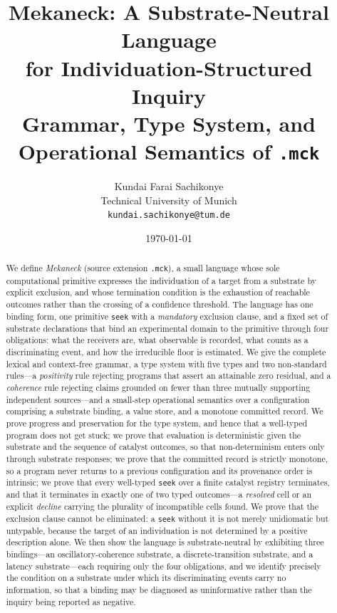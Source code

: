 \documentclass[11pt,a4paper]{article}
\title{\textbf{Mekaneck: A Substrate-Neutral Language\\[2pt]
for Individuation-Structured Inquiry}\\[4pt]
\large Grammar, Type System, and Operational Semantics of \texttt{.mck}}
\author{%
Kundai Farai Sachikonye\\
\small Technical University of Munich\\
\small \texttt{kundai.sachikonye@tum.de}}
\date{\today}
\theoremstyle{thmstyle}
\theoremstyle{definition}
\theoremstyle{remark}
\begin{document}
\maketitle

\begin{abstract}
\noindent
We define \emph{Mekaneck} (source extension \texttt{.mck}), a small language
whose sole computational primitive expresses the individuation of a target
from a substrate by explicit exclusion, and whose termination condition is
the exhaustion of reachable outcomes rather than the crossing of a
confidence threshold. The language has one binding form, one primitive
\texttt{seek} with a \emph{mandatory} exclusion clause, and a fixed set of
substrate declarations that bind an experimental domain to the primitive
through four obligations: what the receivers are, what observable is
recorded, what counts as a discriminating event, and how the irreducible
floor is estimated. We give the complete lexical and context-free grammar,
a type system with five types and two non-standard rules---a
\emph{positivity} rule rejecting programs that assert an attainable zero
residual, and a \emph{coherence} rule rejecting claims grounded on fewer
than three mutually supporting independent sources---and a small-step
operational semantics over a configuration comprising a substrate binding, a
value store, and a monotone committed record. We prove progress and
preservation for the type system, and hence that a well-typed program does
not get stuck; we prove that evaluation is deterministic given the substrate
and the sequence of catalyst outcomes, so that non-determinism enters only
through substrate responses; we prove that the committed record is strictly
monotone, so a program never returns to a previous configuration and its
provenance order is intrinsic; we prove that every well-typed \texttt{seek}
over a finite catalyst registry terminates, and that it terminates in
exactly one of two typed outcomes---a \emph{resolved} cell or an explicit
\emph{decline} carrying the plurality of incompatible cells found. We prove
that the exclusion clause cannot be eliminated: a \texttt{seek} without it
is not merely unidiomatic but untypable, because the target of an
individuation is not determined by a positive description alone. We then
show the language is substrate-neutral by exhibiting three bindings---an
oscillatory-coherence substrate, a discrete-transition substrate, and a
latency substrate---each requiring only the four obligations, and we
identify precisely the condition on a substrate under which its
discriminating events carry no information, so that a binding may be
diagnosed as uninformative rather than the inquiry being reported as
negative.
\end{abstract}
\end{document}
